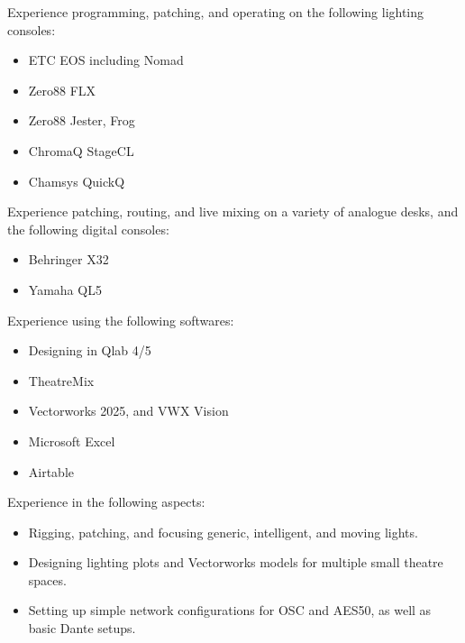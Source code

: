 \documentclass[../../cv-cs.tex]{subfiles}
\begin{document}

Experience programming, patching, and operating on the following lighting consoles:
\begin{itemize}
	\item ETC EOS including Nomad
	\item Zero88 FLX
	\item Zero88 Jester, Frog
	\item ChromaQ StageCL
	\item Chamsys QuickQ
\end{itemize}


Experience patching, routing, and live mixing on a variety of analogue desks, and the following digital consoles:
\begin{itemize}
	\item Behringer X32
	\item Yamaha QL5
\end{itemize}


Experience using the following softwares:
\begin{itemize}
	\item Designing in Qlab 4/5
	\item TheatreMix
	\item Vectorworks 2025, and VWX Vision
	\item Microsoft Excel
	\item Airtable
\end{itemize}


Experience in the following aspects:
\begin{itemize}
	\item Rigging, patching, and focusing generic, intelligent, and moving lights.
	\item Designing lighting plots and Vectorworks models for multiple small theatre spaces.
	\item Setting up simple network configurations for OSC and AES50, as well as basic Dante setups.
\end{itemize}
\end{document}
